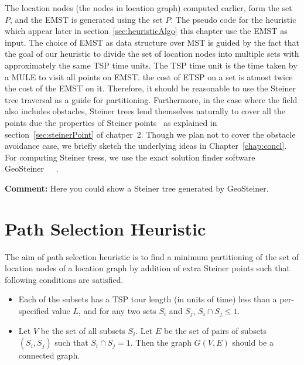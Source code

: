 The location nodes (the nodes in location graph) computed earlier, form 
the set $P$, and the EMST is generated using the set $P$.
The pseudo code for the heuristic
which appear later in section~\ref{sec:heuristicAlgo} this chapter use 
the EMST as input. The choice of EMST as data structure over MST is 
guided by the fact that the goal of our heuristic to divide the set of location nodes into multiple sets with approximately the same TSP time units.
The TSP time unit is the time taken by a MULE to visit all points on EMST.
the cost of ETSP on a set is atmost twice the cost of the EMST on it. Therefore, it should be reasonable to use the Steiner tree traversal as a guide for partitioning. Furthermore, in the case where the field also includes obstacles, Steiner trees lend themselves naturally to cover all the points due the properties of Steiner points~\cite{oaest99} as explained in 
section~\ref{sec:steinerPoint} of chatper~2. Though we plan not to cover the obstacle avoidance case, we briefly sketch the underlying ideas in 
Chapter~\ref{chap:concl}.
For computing Steiner tress, we use the exact solution finder software 
GeoSteiner~\cite{geosteiner1}~\cite{geosteiner2}~\cite{geosteiner3}. 

{\bf Comment:} Here you could show a Steiner tree generated by
GeoSteiner. 

\section{Path Selection Heuristic}

The aim of path selection heuristic is to find a minimum partitioning of
the set of location nodes of a location graph by addition of 
extra Steiner points such that following conditions are satisfied.

\begin{itemize}
\item Each of the subsets has a TSP tour length (in units of time) less than a per-specified value $L$, and for any two sets $S_{i}$ and $S_{j}$, $S_{i} \cap S_{j} \le 1$.
\item Let $V$ be the set of all subsets $S_{i}$. Let $E$ be the set of pairs of subsets $(S_{i},S_{j})$ such that $S_{i} \cap S_{j} = 1$. Then the graph $G(V,E)$ should be a connected graph.
\end{itemize}

